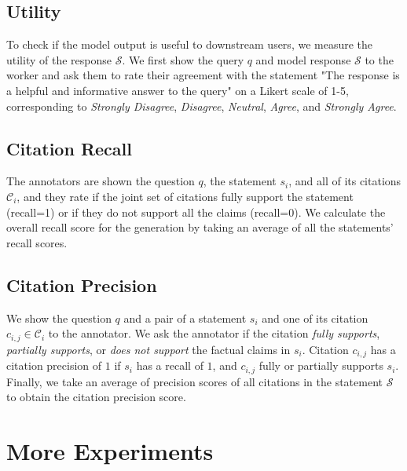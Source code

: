 \subsection{Utility}
To check if the model output is useful to downstream users, we measure the utility of the response $\mathcal{S}$.
We first show the query $q$ and model response $\mathcal{S}$ to the worker and ask them to rate their agreement with  
the statement "The response is a helpful and informative answer to the query" on a Likert scale of 1-5, 
corresponding to \textit{Strongly Disagree}, \textit{Disagree}, \textit{Neutral}, \textit{Agree}, and \textit{Strongly Agree}.


\subsection{Citation Recall}
The annotators are shown the question $q$, the statement $s_i$, and all of its citations $\mathcal{C}_i$, and they rate if the joint set of citations fully support the statement (recall=1) or if they do not support all the claims (recall=0).
We  calculate the overall recall score
for the generation by taking an average of all the statements' recall scores.

\subsection{Citation Precision}
We show the question $q$ and a pair of a statement $s_i$ and one of its citation $c_{i,j} \in \mathcal{C}_i$
to the annotator.
We ask the annotator if the citation  \textit{fully supports}, \textit{partially supports}, or \textit{does not support} the factual claims in $s_i$.
Citation $c_{i,j}$ has a citation precision of $1$ if $s_i$ has a recall of $1$, and
$c_{i,j}$ fully or partially supports $s_i$.
Finally, we take an average of  precision scores of all citations in the statement $\mathcal{S}$ to obtain the citation  precision score.









\section{More Experiments}
\label{app_sec:more_exp}









